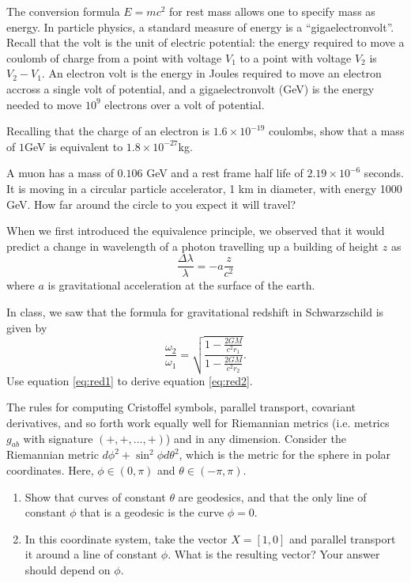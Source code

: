 \documentclass[minion]{homework}
\begin{document}
\hproblem  The conversion formula $E=mc^2$ for rest mass 
allows one to specify mass as energy.  In particle physics, a standard
measure of energy is a ``gigaelectronvolt''.  Recall that the volt
is the unit of electric potential: the energy required to move
a coulomb of charge from a point with voltage $V_1$ to a point with
voltage $V_2$ is $V_2-V_1$.  An electron volt is the energy in Joules required to
move an electron accross a single volt of potential, and a gigaelectronvolt
(GeV) is the energy needed to move $10^{9}$ electrons over a volt of potential.
\begin{subproblems}
\item Recalling that the charge of an electron is $1.6\times 10^{-19}$ coulombs,
show that a mass of $1$GeV is equivalent to $1.8\times 10^{-27}$kg.
\item A muon has a mass of $0.106$ GeV and a rest frame half life of
$2.19\times 10^{-6}$ seconds.  It is moving in a circular particle accelerator,
1 km in diameter, with energy 1000 GeV.  How far around the circle to you expect
it will travel?
\end{subproblems}

\hproblem When we first introduced the equivalence principle, we observed that
it would predict a change in wavelength of a photon travelling up a building of 
height $z$ as
\begin{equation}\label{eq:red1}
\frac{\Delta \lambda}{\lambda} = -a\frac{z}{c^2}
\end{equation}
where $a$ is gravitational acceleration at the surface of the earth.

In class, we saw that the formula for gravitational redshift in Schwarzschild
is given by
\begin{equation}\label{eq:red2}
\frac{\omega_2}{\omega_1} = \sqrt{ \frac{1-\frac{2GM}{c^2r_1}}{1-\frac{2GM}{c^2r_2}} }.
\end{equation}
Use equation \eqref{eq:red1} to derive equation \eqref{eq:red2}.

\hproblem The rules for computing Cristoffel symbols, parallel transport, covariant
derivatives, and so forth work equally well for Riemannian metrics (i.e. metrics
$g_{ab}$ with signature $(+,+,\ldots,+)$) and in any dimension.  Consider the Riemannian
metric $d\phi^2 + \sin^2\phi d\theta^2$, which is the metric for the sphere in polar
coordinates.  Here, $\phi\in(0,\pi)$ and $\theta\in(-\pi,\pi)$.
\begin{enumerate}
\item Show that curves of constant $\theta$ are geodesics, and that the only line
of constant $\phi$ that is a geodesic is the curve $\phi=0$.
\item In this coordinate system, take the vector $X=[1,0]$ and parallel transport
it around a line of constant $\phi$.  What is the resulting vector?  Your answer
should depend on $\phi$.
\end{enumerate}
\end{document}

